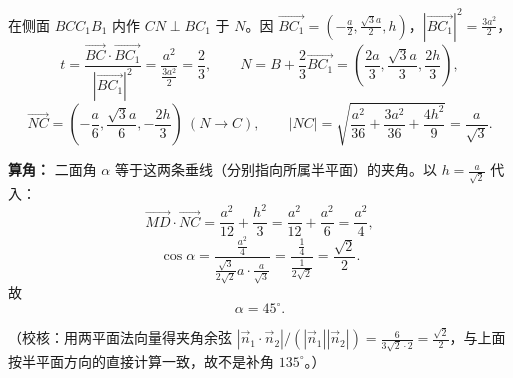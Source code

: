 \begin{answer}
在侧面 $BCC_1B_1$ 内作 $CN\perp BC_1$ 于 $N$。因 $\overrightarrow{BC_1}=\left(-\frac a2,\frac{\sqrt3a}2,h\right)$，$|\overrightarrow{BC_1}|^2=\frac{3a^2}2$，
\nopagebreak[4]
\[t=\frac{\overrightarrow{BC}\cdot\overrightarrow{BC_1}}{|\overrightarrow{BC_1}|^2}=\frac{a^2}{\frac{3a^2}2}=\frac23,\qquad N=B+\frac23\overrightarrow{BC_1}=\left(\frac{2a}3,\frac{\sqrt3a}3,\frac{2h}3\right),\]
\nopagebreak[4]
\[\overrightarrow{NC}=\left(-\frac a6,\frac{\sqrt3a}6,-\frac{2h}3\right)\ (N\to C),\qquad |NC|=\sqrt{\frac{a^2}{36}+\frac{3a^2}{36}+\frac{4h^2}9}=\frac{a}{\sqrt3}.\]

\textbf{算角：} 二面角 $\alpha$ 等于这两条垂线（分别指向所属半平面）的夹角。以 $h=\frac{a}{\sqrt2}$ 代入：
\nopagebreak[4]
\[\overrightarrow{MD}\cdot\overrightarrow{NC}=\frac{a^2}{12}+\frac{h^2}{3}=\frac{a^2}{12}+\frac{a^2}{6}=\frac{a^2}{4},\]
\nopagebreak[4]
\[\cos\alpha=\frac{\frac{a^2}4}{\frac{\sqrt3}{2\sqrt2}a\cdot\frac a{\sqrt3}}=\frac{\frac14}{\frac{1}{2\sqrt2}}=\frac{\sqrt2}{2}.\]
故
\nopagebreak[4]
\[\boxed{\alpha=45^\circ.}\]

（校核：用两平面法向量得夹角余弦 $|\vec n_1\cdot\vec n_2|/(|\vec n_1||\vec n_2|)=\frac6{3\sqrt2\cdot2}=\frac{\sqrt2}2$，与上面按半平面方向的直接计算一致，故不是补角 $135^\circ$。）



\end{answer}
